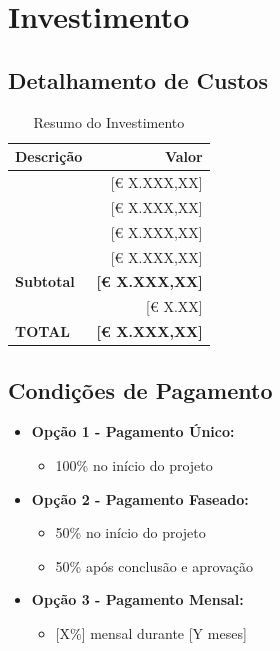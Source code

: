 \section{Investimento}

\subsection{Detalhamento de Custos}

\bigskip

\begin{table}[H]
    \centering
    \caption{Resumo do Investimento}
    \label{tab:investimento}
    \begin{tabular}{|l|r|}
        \hline
        \textbf{Descrição} & \textbf{Valor} \\
        \hline
        [Componente/Serviço 1] & [€ X.XXX,XX] \\
        \hline
        [Componente/Serviço 2] & [€ X.XXX,XX] \\
        \hline
        [Componente/Serviço 3] & [€ X.XXX,XX] \\
        \hline
        [Componente/Serviço 4] & [€ X.XXX,XX] \\
        \hline
        \textbf{Subtotal} & \textbf{[€ X.XXX,XX]} \\
        \hline
        [Impostos/Taxes se aplicável] & [€ X.XX] \\
        \hline
        \textbf{TOTAL} & \textbf{[€ X.XXX,XX]} \\
        \hline
    \end{tabular}
\end{table}

\vskip 1cm

\subsection{Condições de Pagamento}

\begin{itemize}
    \item \textbf{Opção 1 - Pagamento Único:}
    \begin{itemize}
        \item 100\% no início do projeto
    \end{itemize}
    
    \item \textbf{Opção 2 - Pagamento Faseado:}
    \begin{itemize}
        \item 50\% no início do projeto
        \item 50\% após conclusão e aprovação
    \end{itemize}
    
    \item \textbf{Opção 3 - Pagamento Mensal:}
    \begin{itemize}
        \item {[X\%]} mensal durante {[Y meses]}
    \end{itemize}
\end{itemize}

